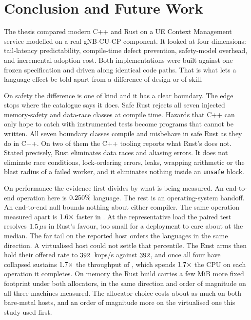 \documentclass[english,twoside,openright,a4paper,censored,csm,software-track-2020]{HYthesisML}
\begin{document}
\chapter{Conclusion and Future Work\label{chapter:conclusions}}

The thesis compared modern C++ and Rust on a UE Context Management service modelled on a
real gNB-CU-CP component. It looked at four dimensions: tail-latency predictability,
compile-time defect prevention, safety-model overhead, and incremental-adoption cost.
Both implementations were built against one frozen specification and driven along identical
code paths. That is what lets a language effect be told apart from a difference of design
or of skill.

On safety the difference is one of kind and it has a clear boundary. The edge stops where
the catalogue says it does. Safe Rust rejects all seven injected memory-safety and
data-race classes at compile time. Hazards that C++ can only hope to catch with
instrumented tests become programs that cannot be written. All seven boundary classes
compile and misbehave in safe Rust as they do in C++. On two of them the C++ tooling
reports what Rust's does not. Stated precisely, Rust eliminates data races and aliasing
errors. It does not eliminate race conditions, lock-ordering errors, leaks, wrapping
arithmetic or the blast radius of a failed worker, and it eliminates nothing inside an
\texttt{unsafe} block.

On performance the evidence first divides by what is being measured. An end-to-end
operation here is $0.250\%$ language. The rest is an operating-system
handoff. An end-to-end null bounds nothing about either compiler. The same operation
measured apart is $1.6\times$ faster in \BudgetCoreFaster{}. At the
representative load the paired test resolves $1.5\,\mu$s in Rust's favour,
too small for a deployment to care about at the median. The far tail on the reported host
orders the languages in the same direction. A virtualised host could not settle that
percentile. The Rust arms then hold their offered rate to $392$~kops/s against
$392$, and once all four have collapsed \OverloadSustainedFaster{} sustains
$1.7\times$ the throughput of \OverloadSustainedSlower{}, which spends
$1.7\times$ the CPU on each operation it completes. On memory the Rust
build carries a few MiB more fixed footprint under both allocators, in the same direction
and order of magnitude on all three machines measured. The allocator choice costs about as
much on both bare-metal hosts, and an order of magnitude more on the virtualised one this
study used first.
\end{document}
